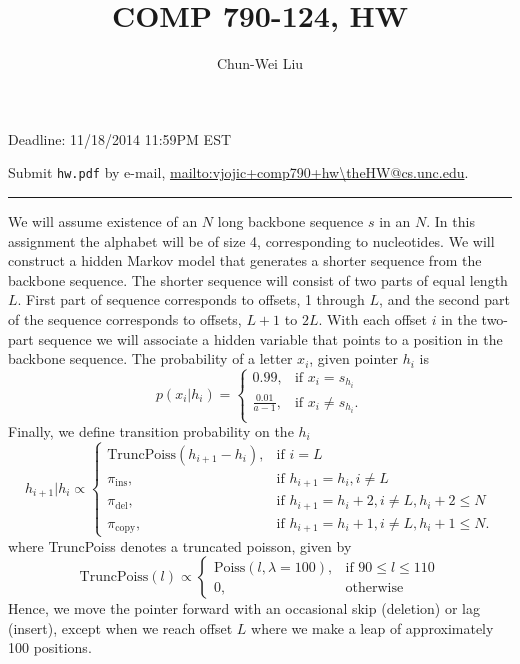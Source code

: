 \documentclass{article}
\begin{document}
\author{Chun-Wei Liu}
\setcounter{HW}{3}
\title{COMP  790-124, HW\theHW}
\maketitle

{ Deadline: 11/18/2014 11:59PM EST}

{ Submit \texttt{hw\theHW.pdf} by e-mail,  \url{mailto:vjojic+comp790+hw\theHW@cs.unc.edu}}.


\noindent\rule{\textwidth}{3pt}
 We will assume existence of an $N$ long backbone sequence $s$ in an $N$. In this assignment the alphabet will be of size 4, corresponding to nucleotides. We will construct a hidden Markov model that generates a shorter sequence from the backbone sequence. The shorter sequence will consist of two parts of equal length $L$. First part of sequence corresponds to offsets, 1 through $L$, and the second part of the sequence corresponds to offsets, $L+1$ to $2L$. With each offset $i$ in the two-part sequence we will associate a hidden variable that points to a position in the backbone sequence.
 The probability of a letter $x_i$, given pointer $h_i$ is
 \[
 p(x_i|h_i) = \begin{cases}
 0.99,& \mbox{if } x_i = s_{h_i} \\
 \frac{0.01}{a - 1},& \mbox{if } x_i \neq s_{h_i}. \\
 \end{cases}
 \]
 Finally, we define transition probability on the $h_i$
 \[
h_{i+1}|h_i \propto
\begin{cases}
\textrm{TruncPoiss}(h_{i+1} - h_i), & \mbox{if } i = L\\
\pi_{\textrm{ins}}, &\mbox{if } h_{i+1} = h_i, i \neq L \\
\pi_{\textrm{del}}, & \mbox{if } h_{i+1} = h_i+2, i \neq L, h_i+2 \leq N \\
\pi_{\textrm{copy}}, &  \mbox{if } h_{i+1} = h_i+1,i \neq L, h_i+1 \leq N.
\end{cases}
\]
where TruncPoiss denotes a truncated poisson, given by
\[
\textrm{TruncPoiss}(l) \propto \begin{cases}
\textrm{Poiss}(l,\lambda=100), &\mbox{if } 90\leq l \leq 110 \\
0 , &\mbox{otherwise }
\end{cases}
\]
 Hence, we move the pointer forward with an occasional skip (deletion) or lag (insert), except when we reach offset $L$ where we make a leap of approximately 100 positions.
\end{document}
